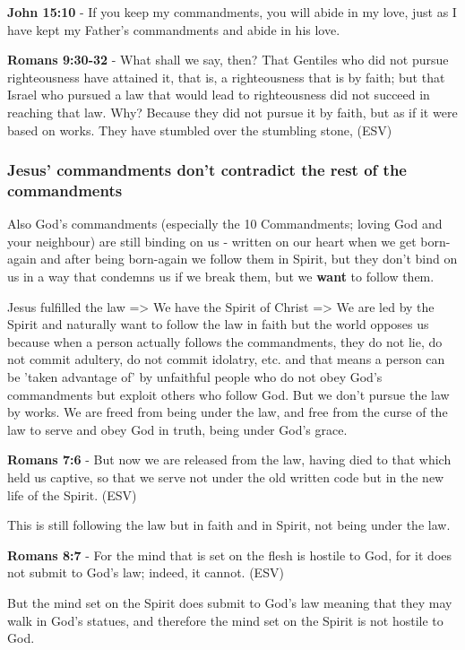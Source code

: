 \documentclass[11pt]{article}
\begin{document}
\textbf{John 15:10} - If you keep my commandments, you will abide in my love, just as I have kept my Father's commandments and abide in his love.

\textbf{Romans 9:30-32} - What shall we say, then? That Gentiles who did not pursue righteousness have attained it, that is, a righteousness that is by faith; but that Israel who pursued a law that would lead to righteousness did not succeed in reaching that law. Why? Because they did not pursue it by faith, but as if it were based on works. They have stumbled over the stumbling stone, (ESV)

\subsubsection{Jesus' commandments don't contradict the rest of the commandments}
\label{sec:org6198ee6}
Also God's commandments (especially the 10 Commandments; loving God and your neighbour) are still binding on us - written on our heart when we get born-again and after being born-again we follow them in Spirit, but they don't bind on us in a way that condemns us if we  break them, but we \textbf{want} to follow them.

Jesus fulfilled the law => We have the Spirit of Christ => We are led by the Spirit and naturally want to follow the law in faith but the world opposes us because when a person actually follows the commandments, they do not lie, do not commit adultery, do not commit idolatry, etc. and that means a person can be 'taken advantage of' by unfaithful people who do not obey God's commandments but exploit others who follow God.
But we don't pursue the law by works. We are freed from being under the law, and free from the curse of the law to serve and obey God in truth, being under God's grace.

\textbf{Romans 7:6} - But now we are released from the law, having died to that which held us captive, so that we serve not under the old written code but in the new life of the Spirit. (ESV)

This is still following the law but in faith and in Spirit, not being under the law.

\textbf{Romans 8:7} - For the mind that is set on the flesh is hostile to God, for it does not submit to God's law; indeed, it cannot. (ESV)

But the mind set on the Spirit does submit to God's law meaning that they may walk in God's statues, and therefore the mind set on the Spirit is not hostile to God.
\end{document}
